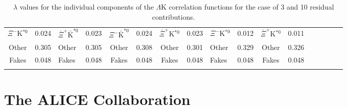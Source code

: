 \documentclass[ALICE,manyauthors]{cernphprep}
\newcommand{\LamK}{$\Lambda$K\xspace}
\begin{document}
\begin{landscape}
\begin{table}[htbp]
{\begin{tabular}{|c|cV{5.0}c|cV{5.0}c|cV{5.0}c|cV{5.0}c|cV{5.0}c|c|}
  $\Xi^{-}$K$^{*0}$ & 0.024 & $\bar{\Xi}^{+}\bar{\mathrm{K}}^{*0}$ & 0.023 & $\Xi^{-}\bar{\mathrm{K}}^{*0}$ & 0.024 & $\bar{\Xi}^{+}$K$^{*0}$ & 0.023 & $\Xi^{-}$K$^{*0}$ & 0.012 & $\bar{\Xi}^{+}$K$^{*0}$ & 0.011 \\
  Other & 0.305 & Other & 0.305 & Other & 0.308 & Other & 0.301 & Other & 0.329 & Other & 0.326 \\
  Fakes & 0.048 & Fakes & 0.048 & Fakes & 0.048 & Fakes & 0.048 & Fakes & 0.048 & Fakes & 0.048 \\
 \end{tabular}}
 \caption{$\lambda$ values for the individual components of the \LamK correlation functions for the case of 3 and 10 residual contributions.}
 \label{tab:LambdaValues_All}
\end{table}

\end{landscape}
\pagestyle{plain}





\section{The ALICE Collaboration}
\label{app:collab}
\end{document}
